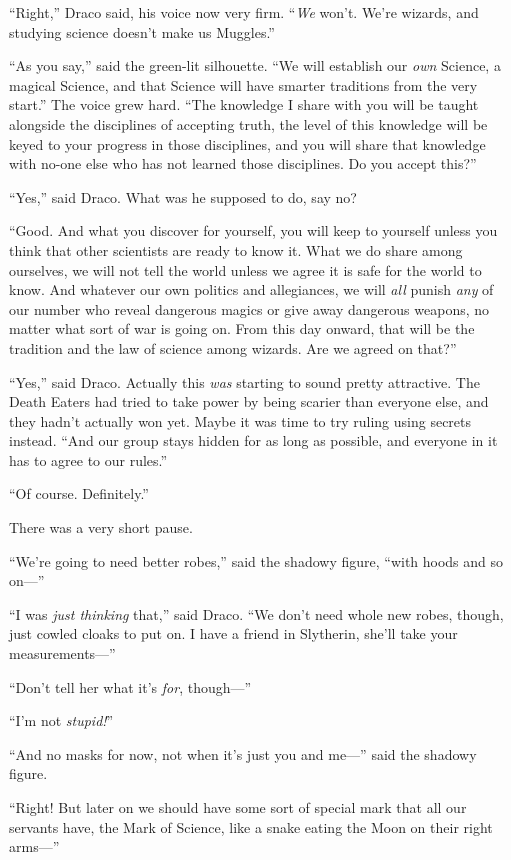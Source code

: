 “Right,” Draco said, his voice now very firm. “\emph{We} won’t. We’re wizards, and studying science doesn’t make us Muggles.”

“As you say,” said the green-lit silhouette. “We will establish our \emph{own} Science, a magical Science, and that Science will have smarter traditions from the very start.” The voice grew hard. “The knowledge I share with you will be taught alongside the disciplines of accepting truth, the level of this knowledge will be keyed to your progress in those disciplines, and you will share that knowledge with no-one else who has not learned those disciplines. Do you accept this?”

“Yes,” said Draco. What was he supposed to do, say no?

“Good. And what you discover for yourself, you will keep to yourself unless you think that other scientists are ready to know it. What we do share among ourselves, we will not tell the world unless we agree it is safe for the world to know. And whatever our own politics and allegiances, we will \emph{all} punish \emph{any} of our number who reveal dangerous magics or give away dangerous weapons, no matter what sort of war is going on. From this day onward, that will be the tradition and the law of science among wizards. Are we agreed on that?”

“Yes,” said Draco. Actually this \emph{was} starting to sound pretty attractive. The Death Eaters had tried to take power by being scarier than everyone else, and they hadn’t actually won yet. Maybe it was time to try ruling using secrets instead. “And our group stays hidden for as long as possible, and everyone in it has to agree to our rules.”

“Of course. Definitely.”

There was a very short pause.

“We’re going to need better robes,” said the shadowy figure, “with hoods and so on—”

“I was \emph{just thinking} that,” said Draco. “We don’t need whole new robes, though, just cowled cloaks to put on. I have a friend in Slytherin, she’ll take your measurements—”

“Don’t tell her what it’s \emph{for}, though—”

“I’m not \emph{stupid!}”

“And no masks for now, not when it’s just you and me—” said the shadowy figure.

“Right! But later on we should have some sort of special mark that all our servants have, the Mark of Science, like a snake eating the Moon on their right arms—”

